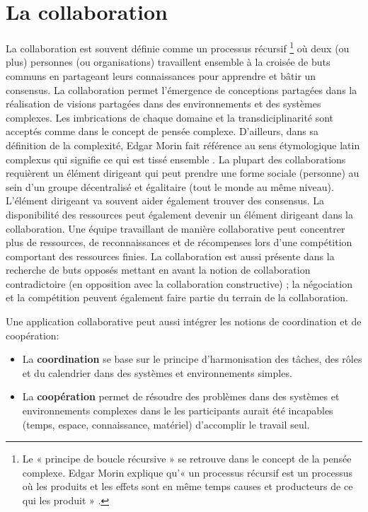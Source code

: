 



\section{La collaboration}
La collaboration  est souvent 
définie comme un processus récursif
\footnote{Le « principe de boucle 
	récursive » se retrouve dans le concept de la pensée complexe. Edgar Morin  
	explique qu'« un processus récursif est un processus où les produits et les 
	effets 
	sont en même temps causes et producteurs de ce qui les produit » 
	\cite[p. 100]{Morin1990}.} où deux (ou plus) personnes (ou organisations) 
travaillent ensemble à la croisée de buts communs 
en partageant leurs connaissances pour apprendre et bâtir un consensus. 
La collaboration permet l'émergence de conceptions partagées dans la réalisation 
de visions partagées dans des environnements et des systèmes complexes. 
Les imbrications de chaque domaine et la transdiciplinarité sont acceptés comme 
dans le concept de pensée complexe. D'ailleurs, dans sa définition de la 
complexité, Edgar Morin fait référence au sens étymologique latin \og 
complexus\fg{} qui signifie \og ce qui est tissé ensemble\fg{} \cite{Morin1990a}.
La plupart des collaborations requièrent un élément dirigeant qui peut prendre une 
forme sociale (personne) au sein d'un groupe décentralisé et égalitaire (tout le 
monde au même niveau). L'élément dirigeant va souvent aider également trouver 
des consensus. 
La disponibilité des ressources peut également devenir un élément dirigeant dans 
la collaboration.
Une équipe travaillant de manière collaborative peut concentrer plus de 
ressources, de reconnaissances et de récompenses lors d'une 
compétition comportant des ressources finies. 
La collaboration est aussi présente dans la recherche de buts opposés mettant en 
avant la notion de collaboration contradictoire (en opposition avec la collaboration 
constructive) ; la négociation et la compétition peuvent également faire partie du 
terrain 
de la collaboration.

Une application collaborative peut aussi intégrer les notions de coordination et de 
coopération:
\begin{itemize}
	\item La \textbf{coordination} se base sur le principe d'harmonisation des 
	tâches, des rôles et du calendrier dans des systèmes et environnements 
	simples.
	\item La \textbf{coopération} permet de résoudre des problèmes dans des 
	systèmes et environnements complexes dans le les participants aurait été 
	incapables (temps, espace, connaissance, matériel) d'accomplir le travail seul.
\end{itemize}

